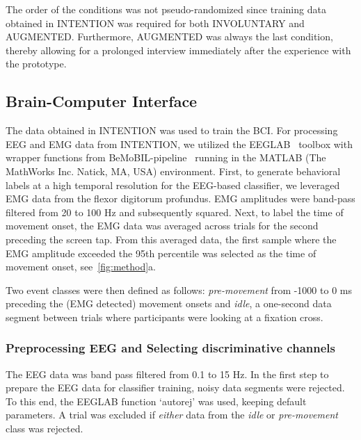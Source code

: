 The order of the conditions was not pseudo-randomized since training data obtained in INTENTION was required for both INVOLUNTARY and AUGMENTED. Furthermore, AUGMENTED was always the last condition, thereby allowing for a prolonged interview immediately after the experience with the prototype.

\subsection{Brain-Computer Interface}\label{BCI}
The data obtained in INTENTION was used to train the BCI. For processing EEG and EMG data from INTENTION, we utilized the EEGLAB~\cite{Delorme2004-sn} toolbox with wrapper functions from BeMoBIL-pipeline~\cite{Klug2022-lc} running in the MATLAB (The MathWorks Inc. Natick, MA, USA) environment. First, to generate behavioral labels at a high temporal resolution for the EEG-based classifier, we leveraged EMG data from the flexor digitorum profundus. EMG amplitudes were band-pass filtered from 20 to 100 Hz and subsequently squared. Next, to label the time of movement onset, the EMG data was averaged across trials for the second preceding the screen tap. From this averaged data, the first sample where the EMG amplitude exceeded the 95th percentile was selected as the time of movement onset, see~\ref{fig:method}a.


Two event classes were then defined as follows: \textit{pre-movement} from -1000 to 0 ms preceding the (EMG detected) movement onsets and \textit{idle}, a one-second data segment between trials where participants were looking at a fixation cross.

\subsubsection{Preprocessing EEG and Selecting discriminative channels}\label{eeg_methods}
The EEG data was band pass filtered from 0.1 to 15 Hz. In the first step to prepare the EEG data for classifier training, noisy data segments were rejected. To this end, the EEGLAB function `autorej' was used, keeping default parameters. A trial was excluded if \textit{either} data from the \textit{idle} or \textit{pre-movement} class was rejected.

